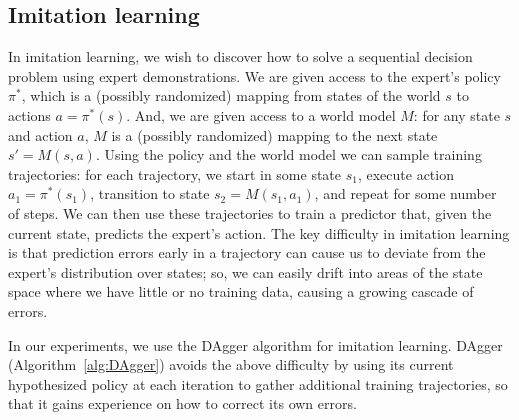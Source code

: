 \documentclass[twoside,11pt]{article}
\begin{document}

\subsection{Imitation learning}

In imitation learning, we wish to discover how to solve a sequential decision problem using expert demonstrations.  We are given access to the expert's policy $\pi^*$, which is a (possibly randomized) mapping from states of the world $s$ to actions $a=\pi^*(s)$.  And, we are given access to a world model $M$: for any state $s$ and action $a$, $M$ is a (possibly randomized) mapping to the next state $s'=M(s,a)$.
Using the policy and the world model we can sample training trajectories: for each trajectory, we start in some state $s_1$, execute action $a_1=\pi^*(s_1)$, transition to state $s_2=M(s_1,a_1)$, and repeat for some number of steps.  We can then use these trajectories to train a predictor that, given the current state, predicts the expert's action.
The key difficulty in imitation learning is that prediction errors early in a trajectory can cause us to deviate from the expert's distribution over states; so, we can easily drift into areas of the state space where we have little or no training data, causing a growing cascade of errors.

In our experiments, we use the DAgger algorithm for imitation learning.  DAgger (Algorithm~\ref{alg:DAgger}) avoids the above difficulty by using its current hypothesized policy at each iteration to gather additional training trajectories, so that it gains experience on how to correct its own errors.

\end{document}
